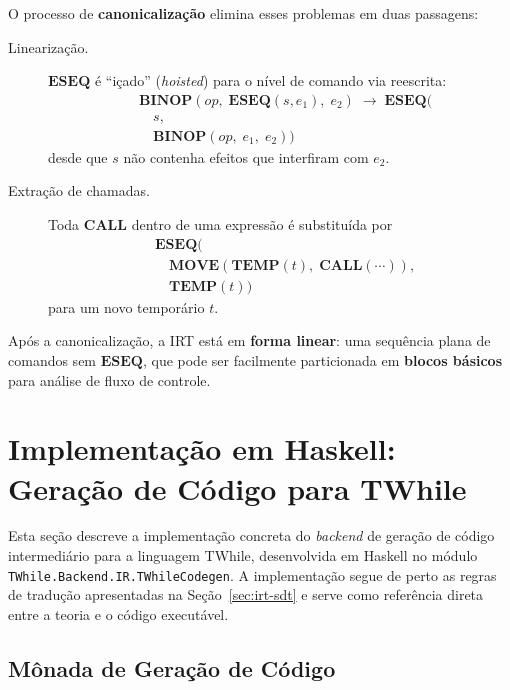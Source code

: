O processo de \textbf{canonicalização} elimina esses problemas em duas
passagens:

\begin{description}
  \item[Linearização.] $\mathbf{ESEQ}$ é ``içado'' (\emph{hoisted}) para
    o nível de comando via reescrita:
    \[
      \begin{aligned}
        &\mathbf{BINOP}(\mathit{op},\; \mathbf{ESEQ}(s, e_1),\; e_2)
        \;\longrightarrow\;
        \mathbf{ESEQ}( \\
          &\quad s, \\
        &\quad \mathbf{BINOP}(\mathit{op},\; e_1,\; e_2))
      \end{aligned}
    \]
    desde que $s$ não contenha efeitos que interfiram com $e_2$.

  \item[Extração de chamadas.] Toda $\mathbf{CALL}$ dentro de uma expressão
    é substituída por
    \[
      \begin{aligned}
        &\mathbf{ESEQ}( \\
          &\quad \mathbf{MOVE}(\mathbf{TEMP}(t),\; \mathbf{CALL}(\cdots)), \\
        &\quad \mathbf{TEMP}(t))
      \end{aligned}
    \]
    para um novo temporário $t$.
\end{description}

Após a canonicalização, a IRT está em \textbf{forma linear}: uma sequência
plana de comandos sem $\mathbf{ESEQ}$, que pode ser facilmente particionada
em \textbf{blocos básicos} para análise de fluxo de controle.

\section{Implementação em Haskell: Geração de Código para
TWhile}\label{sec:ir-impl-haskell}

Esta seção descreve a implementação concreta do \emph{backend} de geração de
código intermediário para a linguagem TWhile, desenvolvida em Haskell no módulo
\texttt{TWhile.Backend.IR.TWhileCodegen}.  A implementação segue de perto as
regras de tradução apresentadas na Seção~\ref{sec:irt-sdt} e serve como
referência direta entre a teoria e o código executável.

\subsection{Mônada de Geração de Código}\label{sec:ir-impl-monad}

